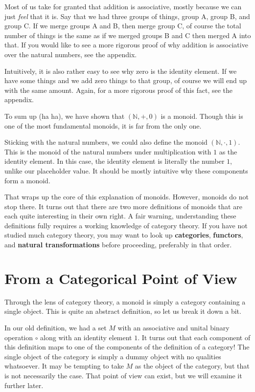 \documentclass{article}
\begin{document}
Most of us take for granted that addition is associative, mostly because we can
just \textit{feel} that it is. Say that we had three groups of things, group A,
group B, and group C. If we merge groups A and B, then merge group C, of course
the total number of things is the same as if we merged groups B and C then
merged A into that. If you would like to see a more rigorous proof of why
addition is associative over the natural numbers, see the appendix.

Intuitively, it is also rather easy to see why zero is the identity element. If
we have some things and we add zero things to that group, of course we will end
up with the same amount. Again, for a more rigorous proof of this fact, see the
appendix.

To sum up (ha ha), we have shown that $(\mathbb{N}, +, 0)$ is a monoid. Though
this is one of the most fundamental monoids, it is far from the only one.

Sticking with the natural numbers, we could also define the monoid
$(\mathbb{N}, \cdot, 1)$. This is the monoid of the natural numbers under
multiplication with $1$ as the identity element. In this case, the identity
element is literally the number $1$, unlike our placeholder value. It should be
mostly intuitive why these components form a monoid.

That wraps up the core of this explanation of monoids. However, monoids do not
stop there. It turns out that there are two more definitions of monoids that
are each quite interesting in their own right. A fair warning, understanding
these definitions fully requires a working knowledge of category theory. If you
have not studied much category theory, you may want to look up
\textbf{categories}, \textbf{functors}, and \textbf{natural transformations}
before proceeding, preferably in that order.

\section{From a Categorical Point of View}

Through the lens of category theory, a monoid is simply a category containing a
single object. This is quite an abstract definition, so let us break it down a
bit.

In our old definition, we had a set $M$ with an associative and unital binary
operation $\circ$ along with an identity element $1$. It turns out that each
component of this definition maps to one of the components of the definition of
a category! The single object of the category is simply a dummy object with no
qualities whatsoever. It may be tempting to take $M$ as the object of the
category, but that is not necessarily the case. That point of view can exist,
but we will examine it further later.
\end{document}
